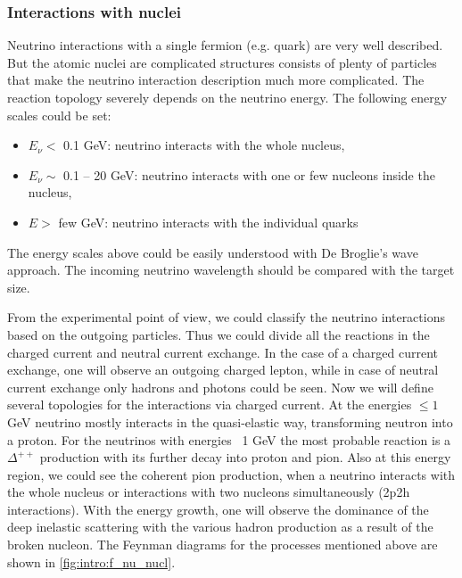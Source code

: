 \documentclass[../main.tex]{subfiles}
\begin{document}
\subsubsection{Interactions with nuclei}
\label{sec:intro:nuclei}
Neutrino interactions with a single fermion (e.g. quark) are very well described. But the atomic nuclei are complicated structures consists of plenty of particles that make the neutrino interaction description much more complicated. The reaction topology severely depends on the neutrino energy. The following energy scales could be set:
\begin{itemize}
  \item $E_\nu <$ 0.1 GeV: neutrino interacts with the whole nucleus,
  \item $E_\nu\sim$ 0.1 -- 20 GeV: neutrino interacts with one or few nucleons inside the nucleus,
  \item $E>$ few GeV: neutrino interacts with the individual quarks
\end{itemize}

The energy scales above could be easily understood with De Broglie's wave approach. The incoming neutrino wavelength should be compared with the target size.

From the experimental point of view, we could classify the neutrino interactions based on the outgoing particles. Thus we could divide all the reactions in the charged current and neutral current exchange. In the case of a charged current exchange, one will observe an outgoing charged lepton, while in case of neutral current exchange only hadrons and photons could be seen. Now we will define several topologies for the interactions via charged current. At the energies $\le1$ GeV neutrino mostly interacts in the quasi-elastic way, transforming neutron into a proton. For the neutrinos with energies ~1 GeV the most probable reaction is a $\Delta^{++}$ production with its further decay into proton and pion. Also at this energy region, we could see the coherent pion production, when a neutrino interacts with the whole nucleus or interactions with two nucleons simultaneously (2p2h interactions). With the energy growth, one will observe the dominance of the deep inelastic scattering with the various hadron production as a result of the broken nucleon. The Feynman diagrams for the processes mentioned above are shown in \autoref{fig:intro:f_nu_nucl}.
\end{document}
